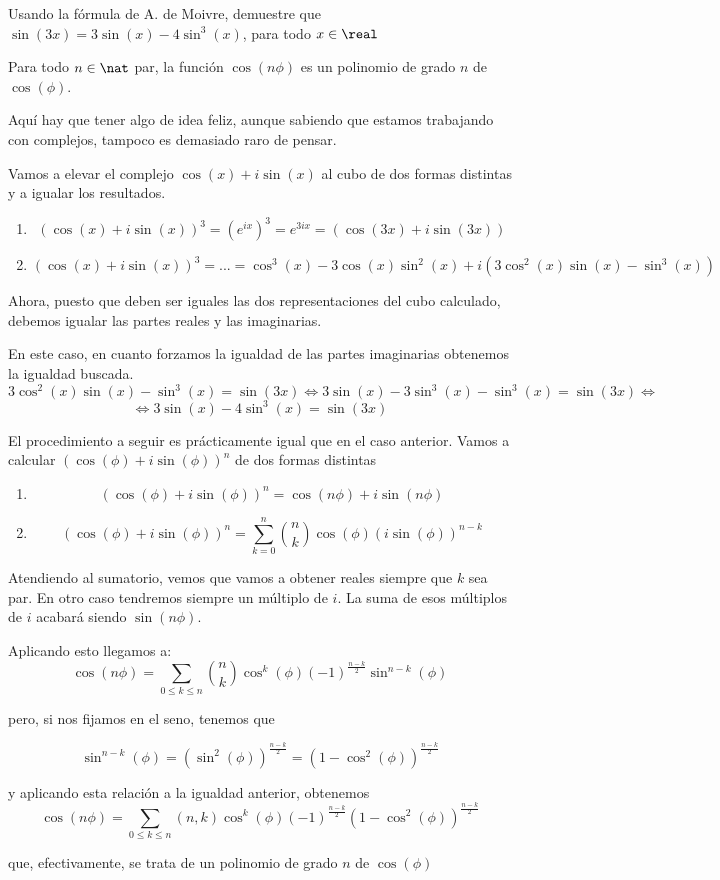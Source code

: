 \begin{problem}[6]
Usando la fórmula de A. de Moivre, demuestre que
\ppart
$\sin(3x)=3\sin(x)-4 \sin^3(x)$, para todo $x \in \real$

\ppart
Para todo $n \in \nat$ par, la función $\cos(n \phi)$ es un polinomio de grado $n$ de $\cos(\phi)$.

\solution

\spart
Aquí hay que tener algo de idea feliz, aunque sabiendo que estamos trabajando con complejos, tampoco es demasiado raro de pensar.

Vamos a elevar el complejo $\cos(x)+i \sin(x)$ al cubo de dos formas distintas y a igualar los resultados.

\begin{enumerate}
\item
\[\left( \cos(x)+i \sin (x) \right)^3 = (e^{ix})^3 = e^{3ix} = \left( \cos(3x)+i \sin (3x) \right)\]
\item
\[\left( \cos(x)+i \sin (x) \right)^3 = . . . = \cos^3(x)-3\cos(x)\sin^2(x) + i \left( 3\cos^2(x)\sin(x)-\sin^3(x)\right)\]
\end{enumerate}
Ahora, puesto que deben ser iguales las dos representaciones del cubo calculado, debemos igualar las partes reales y las imaginarias.

En este caso, en cuanto forzamos la igualdad de las partes imaginarias obtenemos la igualdad buscada.
\[3\cos^2(x)\sin(x)-\sin^3(x) = \sin(3x) \iff 3\sin(x) - 3 \sin^3(x) - \sin^3(x)=\sin(3x) \iff\]
\[\iff 3\sin(x) - 4 \sin^3(x)=\sin(3x) \]

\spart
El procedimiento a seguir es prácticamente igual que en el caso anterior. Vamos a calcular $\left(\cos(\phi)+i\sin(\phi)\right)^n$ de dos formas distintas
\begin{enumerate}
\item
\[\left(\cos(\phi)+i\sin(\phi)\right)^n = \cos(n\phi)+i\sin(n\phi)\]
\item
\[\left(\cos(\phi)+i\sin(\phi)\right)^n = \sum_{k=0}^n { n \choose k} \cos(\phi)\left( i \sin (\phi)\right)^{n-k}\]
\end{enumerate}

Atendiendo al sumatorio, vemos que vamos a obtener reales siempre que $k$ sea par. En otro caso tendremos siempre un múltiplo de $i$. La suma de esos múltiplos de $i$ acabará siendo $\sin (n\phi)$.

Aplicando esto llegamos a:
\[\cos(n\phi) = \sum_{0 \leq k \leq n} { n \choose k} \cos^k(\phi)(-1)^{\frac{n-k}{2}}\sin^{n-k}(\phi)\]

pero, si nos fijamos en el seno, tenemos que

\[\sin^{n-k}(\phi) = \left(\sin^2(\phi)\right)^{\frac{n-k}{2}} = \left(1-\cos^2(\phi)\right)^{\frac{n-k}{2}}\]

y aplicando esta relación a la igualdad anterior, obtenemos
\[\cos(n\phi) = \sum_{0 \leq k \leq n} (n,k) \cos^k(\phi)(-1)^{\frac{n-k}{2}}\left(1-\cos^2(\phi)\right)^{\frac{n-k}{2}}\]

que, efectivamente, se trata de un polinomio de grado $n$ de $\cos(\phi)$
\end{problem}

